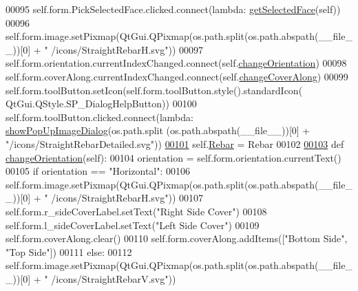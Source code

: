 \begin{DoxyCode}
00095         self.form.PickSelectedFace.clicked.connect(\textcolor{keyword}{lambda}: \hyperlink{namespaceRebarfunc_a8c003df49ac5f249bd9ea4acfb7d2f8d}{getSelectedFace}(self))
00096         self.form.image.setPixmap(QtGui.QPixmap(os.path.split(os.path.abspath(\_\_file\_\_))[0] + \textcolor{stringliteral}{"
      /icons/StraightRebarH.svg"}))
00097         self.form.orientation.currentIndexChanged.connect(self.\hyperlink{classStraightRebar_1_1__StraightRebarTaskPanel_abd7abec4d263edf53efb18396857b370}{changeOrientation})
00098         self.form.coverAlong.currentIndexChanged.connect(self.\hyperlink{classStraightRebar_1_1__StraightRebarTaskPanel_ae99010cf766375812bf24f80cd3f60e1}{changeCoverAlong})
00099         self.form.toolButton.setIcon(self.form.toolButton.style().standardIcon(
      QtGui.QStyle.SP\_DialogHelpButton))
00100         self.form.toolButton.clicked.connect(\textcolor{keyword}{lambda}: \hyperlink{namespacePopUpImage_a8c565620d7de9b4882a44eacb870ad05}{showPopUpImageDialog}(os.path.split
      (os.path.abspath(\_\_file\_\_))[0] + \textcolor{stringliteral}{"/icons/StraightRebarDetailed.svg"}))
\hypertarget{StraightRebar_8py_source.tex_l00101}{}\hyperlink{classStraightRebar_1_1__StraightRebarTaskPanel_a23fe17475277eae59cbed538f0f183cb}{00101}         self.\hyperlink{classStraightRebar_1_1__StraightRebarTaskPanel_a23fe17475277eae59cbed538f0f183cb}{Rebar} = Rebar
00102 
\hypertarget{StraightRebar_8py_source.tex_l00103}{}\hyperlink{classStraightRebar_1_1__StraightRebarTaskPanel_abd7abec4d263edf53efb18396857b370}{00103}     \textcolor{keyword}{def }\hyperlink{classStraightRebar_1_1__StraightRebarTaskPanel_abd7abec4d263edf53efb18396857b370}{changeOrientation}(self):
00104         orientation = self.form.orientation.currentText()
00105         \textcolor{keywordflow}{if} orientation == \textcolor{stringliteral}{"Horizontal"}:
00106             self.form.image.setPixmap(QtGui.QPixmap(os.path.split(os.path.abspath(\_\_file\_\_))[0] + \textcolor{stringliteral}{"
      /icons/StraightRebarH.svg"}))
00107             self.form.r\_sideCoverLabel.setText(\textcolor{stringliteral}{"Right Side Cover"})
00108             self.form.l\_sideCoverLabel.setText(\textcolor{stringliteral}{"Left Side Cover"})
00109             self.form.coverAlong.clear()
00110             self.form.coverAlong.addItems([\textcolor{stringliteral}{"Bottom Side"}, \textcolor{stringliteral}{"Top Side"}])
00111         \textcolor{keywordflow}{else}:
00112             self.form.image.setPixmap(QtGui.QPixmap(os.path.split(os.path.abspath(\_\_file\_\_))[0] + \textcolor{stringliteral}{"
      /icons/StraightRebarV.svg"}))

\end{DoxyCode}
